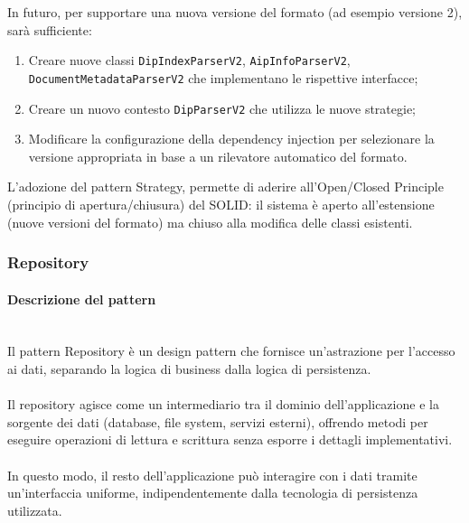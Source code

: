 \documentclass[a4paper,12pt]{article}
\begin{document}
{{{                \noindent In futuro, per supportare una nuova versione del formato (ad esempio versione 2), sarà sufficiente:
                \begin{enumerate}
                    \item Creare nuove classi \texttt{DipIndexParserV2}, \texttt{AipInfoParserV2}, \texttt{DocumentMetadataParserV2} che implementano le rispettive interfacce;
                    \item Creare un nuovo contesto \texttt{DipParserV2} che utilizza le nuove strategie;
                    \item Modificare la configurazione della dependency injection per selezionare la versione appropriata in base a un rilevatore automatico del formato.
                \end{enumerate}
                
                \noindent L'adozione del pattern Strategy, permette di aderire all'Open/Closed Principle (principio di apertura/chiusura) del SOLID: il sistema è aperto all'estensione (nuove versioni del formato) ma chiuso alla modifica delle classi esistenti.
            }
            \subsubsection{Repository} {
                \paragraph{Descrizione del pattern}\mbox{}\\
                Il pattern Repository è un design pattern che fornisce un’astrazione per l’accesso ai dati, separando la logica di business dalla logica di persistenza.\\
                \\
                Il repository agisce come un intermediario tra il dominio dell’applicazione e la sorgente dei dati (database, file system, servizi esterni), offrendo metodi per eseguire operazioni di lettura e scrittura senza esporre i dettagli implementativi.\\
                \\
                In questo modo, il resto dell’applicazione può interagire con i dati tramite un’interfaccia uniforme, indipendentemente dalla tecnologia di persistenza utilizzata.
                
}}}
\end{document}
